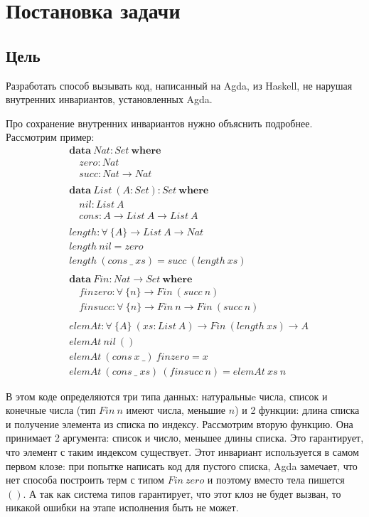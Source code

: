 \section{Постановка задачи}

\subsection{Цель}\label{sec:task-goal}

Разработать способ вызывать код, написанный на Agda, из Haskell, не нарушая
внутренних инвариантов, установленных Agda.

Про сохранение внутренних инвариантов нужно объяснить подробнее. Рассмотрим пример:
\begin{align*}
&\mathbf{data}\ Nat : Set\ \mathbf{where}\\
&\quad zero : Nat\\
&\quad succ : Nat \rightarrow Nat\\
\\
&\mathbf{data}\ List\ (A : Set) : Set\ \mathbf{where}\\
&\quad nil : List\ A\\
&\quad cons : A \rightarrow List\ A \rightarrow List\ A\\
\\
&length : \forall\ \{A\} \rightarrow List\ A \rightarrow Nat\\
&length\ nil = zero\\
&length\ (cons\ \_\ xs) = succ\ (length\ xs)\\
\\
&\mathbf{data}\ Fin : Nat \rightarrow Set\ \mathbf{where}\\
&\quad finzero : \forall\ \{n\} \rightarrow Fin\ (succ\ n)\\
&\quad finsucc : \forall\ \{n\} \rightarrow Fin\ n \rightarrow Fin\ (succ\ n)\\
\\
&elemAt : \forall\ \{A\}\ (xs : List\ A) \rightarrow Fin\ (length\ xs) \rightarrow A\\
&elemAt\ nil\ ()\\
&elemAt\ (cons\ x\ \_)\ finzero = x\\
&elemAt\ (cons\ \_\ xs)\ (finsucc\ n) = elemAt\ xs\ n
\end{align*}

В этом коде определяются три типа данных: натуральныe числа,
список и конечные числа (тип \(Fin\ n\) имеют числа, меньшие \(n\)) и
2 функции: длина списка и получение элемента из списка по индексу.
Рассмотрим вторую функцию. Она принимает 2 аргумента: список и число,
меньшее длины списка. Это гарантирует, что элемент с таким индексом
существует. Этот инвариант используется в самом первом клозе:
при попытке написать код для пустого списка, Agda замечает, что нет способа
построить терм с типом \(Fin\ zero\) и поэтому вместо тела пишется \(()\).
А так как система типов гарантирует, что этот клоз не будет вызван, то
никакой ошибки на этапе исполнения быть не может.


